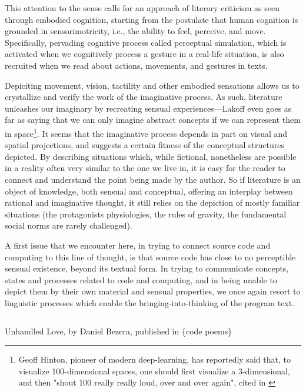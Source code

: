 This attention to the sense calls for an approach of literary criticism as seen through embodied cognition, starting from the postulate that human cognition is grounded in sensorimotricity, i.e., the ability to feel, perceive, and move. Specifically, pervading cognitive process called perceptual simulation, which is activated when we cognitively process a gesture in a real-life situation, is also recruited when we read about actions, movements, and gestures in texts.

Depiciting movement, vision, tactility and other embodied sensations allows us to crystallize and verify the work of the imaginative process. As such, literature unleashes our imaginary by recreating sensual experiences—Lakoff even goes as far as saying that we can only imagine abstract concepts if we can represent them in space\footnote{Geoff Hinton, pioneer of modern deep-learning, has reportedly said that, to visualize 100-dimensional spaces, one should first visualize a 3-dimensional, and then "shout 100 really really loud, over and over again", cited in \citep{akten_journey_2016}}. It seems that the imaginative process depends in part on visual and spatial projections, and suggests a certain fitness of the conceptual structures depicted. By describing situations which, while fictional, nonetheless are possible in a reality often very similar to the one we live in, it is easy for the reader to connect and understand the point being made by the author. So if literature is an object of knowledge, both sensual and conceptual, offering an interplay between rational and imaginative thought, it still relies on the depiction of mostly familiar situations (the protagonists physiologies, the rules of gravity, the fundamental social norms are rarely challenged).

A first issue that we encounter here, in trying to connect source code and computing to this line of thought, is that source code has close to no perceptible sensual existence, beyond its textual form. In trying to communicate concepts, states and processes related to code and computing, and in being unable to depict them by their own material and sensual properties, we once again resort to linguistic processes which enable the bringing-into-thinking of the program text.

\begin{listing}
    \inputminted[]{java}{./corpus/unhandled_love.java}
    \caption{Unhandled Love, by Daniel Bezera, published in \{code poems\} \citep{bertram_code_2012}}
    \label{code:unhandled-love}
\end{listing}

